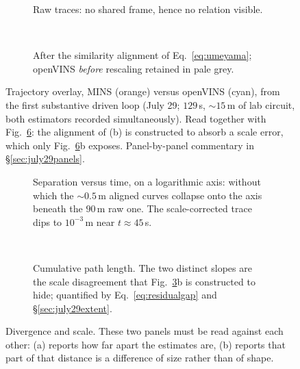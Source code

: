 \begin{figure}[p]
\centering
\begin{subfigure}{\linewidth}\centering
  \caption{Raw traces: no shared frame, hence no relation visible.}
  \label{fig:trajp1}
\end{subfigure}\\[8pt]
\begin{subfigure}{\linewidth}\centering
  \caption{After the similarity alignment of Eq.~\ref{eq:umeyama}; openVINS
  \emph{before} rescaling retained in pale grey.}
  \label{fig:trajp2}
\end{subfigure}
\caption{Trajectory overlay, MINS (orange) versus openVINS (cyan), from the
first substantive driven loop (July 29; $129$\,s, $\sim15$\,m of lab circuit,
both estimators recorded simultaneously). Read together with
Fig.~\ref{fig:trajscale}: the alignment of (b) is constructed to absorb a
scale error, which only Fig.~\ref{fig:trajscale}b exposes. Panel-by-panel
commentary in \S\ref{sec:july29panels}.}
\label{fig:trajcomparison}
\end{figure}

\begin{figure}[p]
\centering
\begin{subfigure}{\linewidth}\centering
  \caption{Separation versus time, on a logarithmic axis: without which the
  $\sim0.5$\,m aligned curves collapse onto the axis beneath the $90$\,m raw
  one. The scale-corrected trace dips to $10^{-3}$\,m near $t\approx45$\,s.}
  \label{fig:trajp3}
\end{subfigure}\\[8pt]
\begin{subfigure}{\linewidth}\centering
  \caption{Cumulative path length. The two distinct slopes are the scale
  disagreement that Fig.~\ref{fig:trajcomparison}b is constructed to hide;
  quantified by Eq.~\ref{eq:residualgap} and \S\ref{sec:july29extent}.}
  \label{fig:trajp4}
\end{subfigure}
\caption{Divergence and scale. These two panels must be read against each
other: (a) reports how far apart the estimates are, (b) reports that part of
that distance is a difference of size rather than of shape.}
\label{fig:trajscale}
\end{figure}

